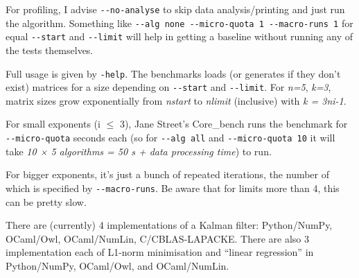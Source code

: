 \documentclass[a4paper,UKenglish]{lipics-v2019}
\begin{document}
For profiling, I advise \texttt{-\/-no-analyse} to skip data
analysis/printing and just run the algorithm. Something like
\texttt{-\/-alg\ none\ -\/-micro-quota\ 1\ -\/-macro-runs\ 1} for equal
\texttt{-\/-start} and \texttt{-\/-limit} will help in getting a
baseline without running any of the tests themselves.

Full usage is given by \texttt{-help}. The benchmarks loads (or
generates if they don't exist) matrices for a size depending on
\texttt{-\/-start} and \texttt{-\/-limit}. For \emph{n=5}, \emph{k=3},
matrix sizes grow exponentially from \emph{nstart} to \emph{nlimit}
(inclusive) with \emph{k = 3ni-1}.

For small exponents (i $\leq$ 3), Jane Street's Core\_bench runs the
benchmark for \texttt{-\/-micro-quota} seconds each (so for
\texttt{-\/-alg\ all} and \texttt{-\/-micro-quota\ 10} it will take
\emph{10 × 5 algorithms = 50 s + data processing time}) to run.

For bigger exponents, it's just a bunch of repeated iterations, the
number of which is specified by \texttt{-\/-macro-runs}. Be aware that
for limits more than 4, this can be pretty slow.

There are (currently) 4 implementations of a Kalman filter:
Python/NumPy, OCaml/Owl, OCaml/NumLin, C/CBLAS-LAPACKE. There are also 3
implementation each of L1-norm minimisation and ``linear regression'' in
Python/NumPy, OCaml/Owl, and OCaml/NumLin.
\end{document}
